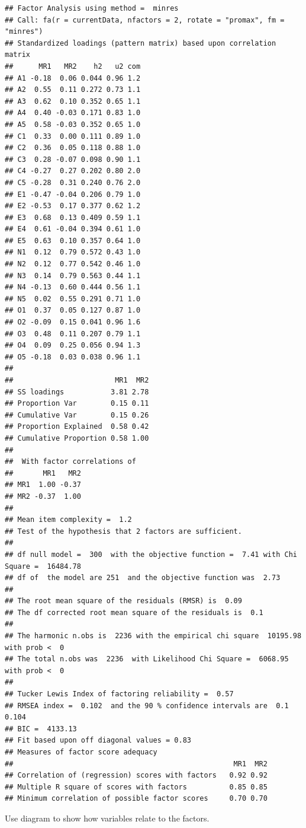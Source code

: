 \documentclass[
]{ctexart}
\begin{document}
\begin{verbatim}
## Factor Analysis using method =  minres
## Call: fa(r = currentData, nfactors = 2, rotate = "promax", fm = "minres")
## Standardized loadings (pattern matrix) based upon correlation matrix
##      MR1   MR2    h2   u2 com
## A1 -0.18  0.06 0.044 0.96 1.2
## A2  0.55  0.11 0.272 0.73 1.1
## A3  0.62  0.10 0.352 0.65 1.1
## A4  0.40 -0.03 0.171 0.83 1.0
## A5  0.58 -0.03 0.352 0.65 1.0
## C1  0.33  0.00 0.111 0.89 1.0
## C2  0.36  0.05 0.118 0.88 1.0
## C3  0.28 -0.07 0.098 0.90 1.1
## C4 -0.27  0.27 0.202 0.80 2.0
## C5 -0.28  0.31 0.240 0.76 2.0
## E1 -0.47 -0.04 0.206 0.79 1.0
## E2 -0.53  0.17 0.377 0.62 1.2
## E3  0.68  0.13 0.409 0.59 1.1
## E4  0.61 -0.04 0.394 0.61 1.0
## E5  0.63  0.10 0.357 0.64 1.0
## N1  0.12  0.79 0.572 0.43 1.0
## N2  0.12  0.77 0.542 0.46 1.0
## N3  0.14  0.79 0.563 0.44 1.1
## N4 -0.13  0.60 0.444 0.56 1.1
## N5  0.02  0.55 0.291 0.71 1.0
## O1  0.37  0.05 0.127 0.87 1.0
## O2 -0.09  0.15 0.041 0.96 1.6
## O3  0.48  0.11 0.207 0.79 1.1
## O4  0.09  0.25 0.056 0.94 1.3
## O5 -0.18  0.03 0.038 0.96 1.1
## 
##                        MR1  MR2
## SS loadings           3.81 2.78
## Proportion Var        0.15 0.11
## Cumulative Var        0.15 0.26
## Proportion Explained  0.58 0.42
## Cumulative Proportion 0.58 1.00
## 
##  With factor correlations of 
##       MR1   MR2
## MR1  1.00 -0.37
## MR2 -0.37  1.00
## 
## Mean item complexity =  1.2
## Test of the hypothesis that 2 factors are sufficient.
## 
## df null model =  300  with the objective function =  7.41 with Chi Square =  16484.78
## df of  the model are 251  and the objective function was  2.73 
## 
## The root mean square of the residuals (RMSR) is  0.09 
## The df corrected root mean square of the residuals is  0.1 
## 
## The harmonic n.obs is  2236 with the empirical chi square  10195.98  with prob <  0 
## The total n.obs was  2236  with Likelihood Chi Square =  6068.95  with prob <  0 
## 
## Tucker Lewis Index of factoring reliability =  0.57
## RMSEA index =  0.102  and the 90 % confidence intervals are  0.1 0.104
## BIC =  4133.13
## Fit based upon off diagonal values = 0.83
## Measures of factor score adequacy             
##                                                    MR1  MR2
## Correlation of (regression) scores with factors   0.92 0.92
## Multiple R square of scores with factors          0.85 0.85
## Minimum correlation of possible factor scores     0.70 0.70
\end{verbatim}

Use diagram to show how variables relate to the factors.
\end{document}
